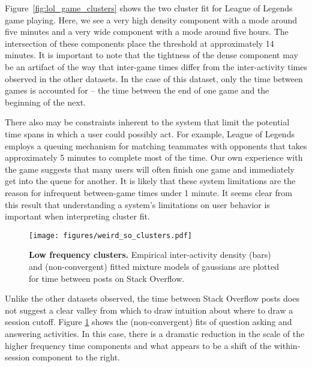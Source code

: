 Figure~\ref{fig:lol_game_clusters} shows the two cluster fit for League of Legends game playing.  Here, we see a very high density component with a mode around five minutes and a very wide component with a mode around five hours.  The intersection of these components place the threshold at approximately 14 minutes.  It is important to note that the tightness of the dense component may be an artifact of the way that inter-game times differ from the inter-activity times observed in the other datasets.  In the case of this dataset, only the time between games is accounted for -- the time between the end of one game and the beginning of the next.

There also may be constraints inherent to the system that limit the potential time spans in which a user could possibly act.  For example, League of Legends employs a queuing mechanism for matching teammates with opponents that takes approximately 5 minutes to complete most of the time.  Our own experience with the game suggests that many users will often finish one game and immediately get into the queue for another.  It is likely that these system limitations are the reason for infrequent between-game times under 1 minute.  It seems clear from this result that understanding a system's limitations on user behavior is important when interpreting cluster fit.

\begin{figure}
\centering
\texttt{[image: figures/weird\_so\_clusters.pdf]}
\caption{
    \textbf{Low frequency clusters.} Empirical inter-activity density (bars) and (non-convergent) fitted mixture models of gaussians are plotted for time between posts on Stack Overflow.
}
\label{fig:stack_overflow_clusters}
\end{figure}
Unlike the other datasets observed, the time between Stack Overflow posts does not suggest a clear valley from which to draw intuition about where to draw a session cutoff.  Figure \ref{fig:stack_overflow_clusters} shows the (non-convergent) fits of question asking and answering activities.  In this case, there is a dramatic reduction in the scale of the higher frequency time components and what appears to be a shift of the within-session component to the right.

